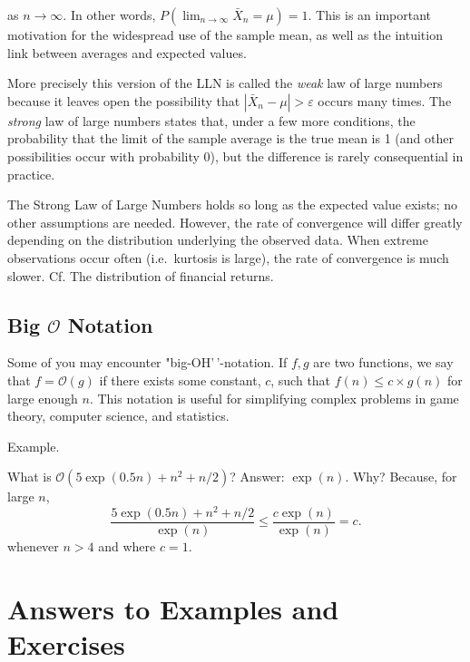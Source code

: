 \documentclass[
]{book}
\theoremstyle{definition}
\theoremstyle{definition}
\theoremstyle{definition}
\theoremstyle{remark}
\begin{document}
as \(n\to \infty\). In other words, \(P( \lim_{n\to\infty}\bar{X}_n = \mu) = 1\). This is an important motivation for the widespread use of the sample mean, as well as the intuition link between averages and expected values.

More precisely this version of the LLN is called the \emph{weak} law of large numbers because it leaves open the possibility that \(|\bar{X}_n - \mu | > \varepsilon\) occurs many times. The \emph{strong} law of large numbers states that, under a few more conditions, the probability that the limit of the sample average is the true mean is 1 (and other possibilities occur with probability 0), but the difference is rarely consequential in practice.

The Strong Law of Large Numbers holds so long as the expected value exists; no other assumptions are needed. However, the rate of convergence will differ greatly depending on the distribution underlying the observed data. When extreme observations occur often (i.e.~kurtosis is large), the rate of convergence is much slower. Cf. The distribution of financial returns.

\hypertarget{big-mathcalo-notation}{%
\subsection{\texorpdfstring{Big \(\mathcal{O}\) Notation}{Big \textbackslash mathcal\{O\} Notation}}\label{big-mathcalo-notation}}

Some of you may encounter "big-OH'\,'-notation. If \(f, g\) are two functions, we say that \(f = \mathcal{O}(g)\) if there exists some constant, \(c\), such that \(f(n) \leq c \times g(n)\) for large enough \(n\). This notation is useful for simplifying complex problems in game theory, computer science, and statistics.

Example.

What is \(\mathcal{O}( 5\exp(0.5 n) + n^2 + n / 2)\)? Answer: \(\exp(n)\). Why? Because, for large \(n\),
\[
\frac{ 5\exp(0.5 n) + n^2 + n / 2 }{ \exp(n)} \leq \frac{ c \exp(n) }{ \exp(n)} = c. 
\]
whenever \(n > 4\) and where \(c = 1\).

\hypertarget{answers-to-examples-and-exercises-2}{%
\section*{Answers to Examples and Exercises}\label{answers-to-examples-and-exercises-2}}
\end{document}
